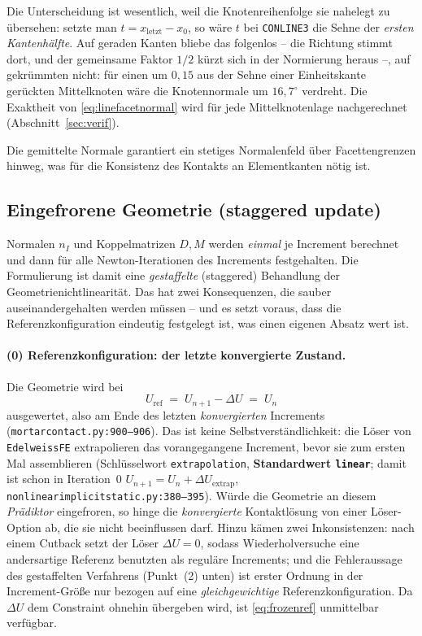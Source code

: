 \documentclass[a4paper,11pt]{article}
\def\bm#1{#1}%
\def\tfrac#1#2{#1/#2}%
\newcommand{\code}[1]{\texttt{\small #1}}
\newcommand{\file}[1]{\texttt{\small #1}}
\begin{document}
\medskip
\noindent Die Unterscheidung ist wesentlich, weil die Knotenreihenfolge sie nahelegt zu übersehen:
setzte man $\bm t=\bm x_{\text{letzt}}-\bm x_0$, so wäre $\bm t$ bei \code{CONLINE3} die Sehne der
\emph{ersten Kantenhälfte}. Auf geraden Kanten bliebe das folgenlos -- die Richtung stimmt dort,
und der gemeinsame Faktor $\tfrac12$ kürzt sich in der Normierung heraus --, auf gekrümmten nicht:
für einen um $0{,}15$ aus der Sehne einer Einheitskante gerückten Mittelknoten wäre die
Knotennormale um $16{,}7^\circ$ verdreht. Die Exaktheit von \eqref{eq:linefacetnormal} wird für
jede Mittelknotenlage nachgerechnet (Abschnitt~\ref{sec:verif}).

Die gemittelte Normale garantiert ein stetiges Normalenfeld über Facettengrenzen hinweg, was für
die Konsistenz des Kontakts an Elementkanten nötig ist.

\subsection{Eingefrorene Geometrie (staggered update)}
\label{sec:frozen}
Normalen $\bm n_I$ und Koppelmatrizen $\bm D,\bm M$ werden \emph{einmal} je Increment berechnet und
dann für alle Newton-Iterationen des Increments festgehalten. Die Formulierung ist damit eine
\emph{gestaffelte} (staggered) Behandlung der Geometrienichtlinearität. Das hat zwei
Konsequenzen, die sauber auseinandergehalten werden müssen -- und es setzt voraus, dass die
Referenzkonfiguration eindeutig festgelegt ist, was einen eigenen Absatz wert ist.

\paragraph{(0) Referenzkonfiguration: der letzte konvergierte Zustand.}
Die Geometrie wird bei
\begin{equation}
\bm U_{\text{ref}} \;=\; \bm U_{n+1} - \Delta\bm U \;=\; \bm U_n
\label{eq:frozenref}
\end{equation}
ausgewertet, also am Ende des letzten \emph{konvergierten} Increments
(\file{mortarcontact.py:\allowbreak{}900--906}). Das ist keine Selbstverständlichkeit: die Löser
von \code{EdelweissFE} extrapolieren das vorangegangene Increment, bevor sie zum ersten Mal
assemblieren (Schlüsselwort \code{extrapolation}, \textbf{Standardwert \code{linear}}; damit ist
schon in Iteration~0 $\bm U_{n+1}=\bm U_n+\Delta\bm U_{\text{extrap}}$,
\file{nonlinearimplicitstatic.py:\allowbreak{}380--395}). Würde die Geometrie an diesem
\emph{Prädiktor} eingefroren, so hinge die \emph{konvergierte} Kontaktlösung von einer
Löser-Option ab, die sie nicht beeinflussen darf. Hinzu kämen zwei Inkonsistenzen: nach einem
Cutback setzt der Löser $\Delta\bm U=\bm 0$, sodass Wiederholversuche eine andersartige Referenz
benutzten als reguläre Increments; und die Fehleraussage des gestaffelten Verfahrens
(Punkt~(2) unten) ist erster Ordnung in der Increment-Größe nur bezogen auf eine
\emph{gleichgewichtige} Referenzkonfiguration. Da $\Delta\bm U$ dem Constraint ohnehin übergeben
wird, ist \eqref{eq:frozenref} unmittelbar verfügbar.
\end{document}
